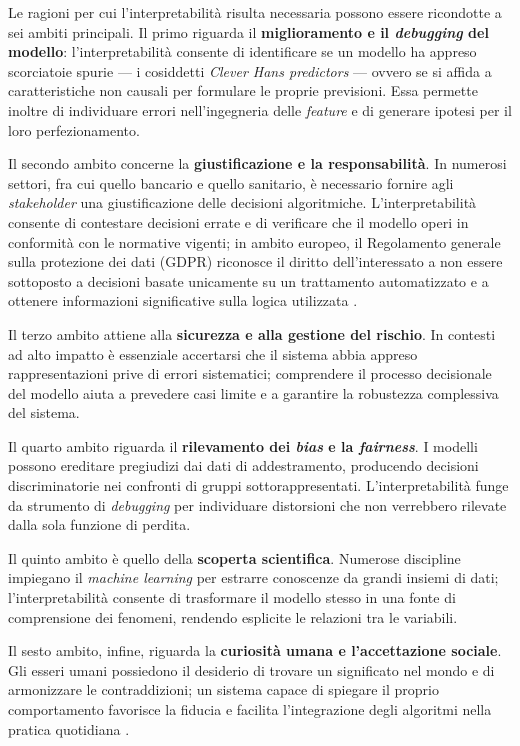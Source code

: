 Le ragioni per cui l'interpretabilità risulta necessaria possono essere ricondotte a sei ambiti principali. Il primo riguarda il \textbf{miglioramento e il \textit{debugging} del modello}: l'interpretabilità consente di identificare se un modello ha appreso scorciatoie spurie --- i cosiddetti \textit{Clever Hans predictors} --- ovvero se si affida a caratteristiche non causali per formulare le proprie previsioni. Essa permette inoltre di individuare errori nell'ingegneria delle \textit{feature} e di generare ipotesi per il loro perfezionamento.

Il secondo ambito concerne la \textbf{giustificazione e la responsabilità}. In numerosi settori, fra cui quello bancario e quello sanitario, è necessario fornire agli \textit{stakeholder} una giustificazione delle decisioni algoritmiche. L'interpretabilità consente di contestare decisioni errate e di verificare che il modello operi in conformità con le normative vigenti; in ambito europeo, il Regolamento generale sulla protezione dei dati (GDPR) riconosce il diritto dell'interessato a non essere sottoposto a decisioni basate unicamente su un trattamento automatizzato e a ottenere informazioni significative sulla logica utilizzata \cite{GDPR_Art22}.

Il terzo ambito attiene alla \textbf{sicurezza e alla gestione del rischio}. In contesti ad alto impatto è essenziale accertarsi che il sistema abbia appreso rappresentazioni prive di errori sistematici; comprendere il processo decisionale del modello aiuta a prevedere casi limite e a garantire la robustezza complessiva del sistema.

Il quarto ambito riguarda il \textbf{rilevamento dei \textit{bias} e la \textit{fairness}}. I modelli possono ereditare pregiudizi dai dati di addestramento, producendo decisioni discriminatorie nei confronti di gruppi sottorappresentati. L'interpretabilità funge da strumento di \textit{debugging} per individuare distorsioni che non verrebbero rilevate dalla sola funzione di perdita.

Il quinto ambito è quello della \textbf{scoperta scientifica}. Numerose discipline impiegano il \textit{machine learning} per estrarre conoscenze da grandi insiemi di dati; l'interpretabilità consente di trasformare il modello stesso in una fonte di comprensione dei fenomeni, rendendo esplicite le relazioni tra le variabili.

Il sesto ambito, infine, riguarda la \textbf{curiosità umana e l'accettazione sociale}. Gli esseri umani possiedono il desiderio di trovare un significato nel mondo e di armonizzare le contraddizioni; un sistema capace di spiegare il proprio comportamento favorisce la fiducia e facilita l'integrazione degli algoritmi nella pratica quotidiana \cite{molnar2025interpretable}.

